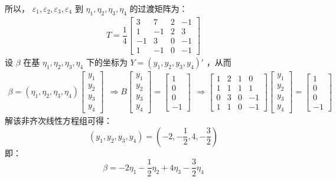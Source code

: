 \documentclass[11pt,a4paper,openany,oneside]{book}
\begin{document}
\begin{enumerate}
所以， $ \varepsilon_1, \varepsilon_2, \varepsilon_3, \varepsilon_4 $ 到 $ \eta_1, \eta_2, \eta_3, \eta_4 $ 的过渡矩阵为：
\begin{gather*}
T =  \dfrac{1}{4}
\begin{bmatrix}
3 & 7 & 2 & -1 \\
1 & -1 & 2 & 3 \\
-1 & 3 & 0 & -1 \\
1 & -1 & 0 & -1
\end{bmatrix}
\end{gather*}
设 $ \beta $ 在基 $ \eta_1, \eta_2, \eta_3, \eta_4 $ 下的坐标为 $ Y=(y_1, y_2, y_3, y_4)' $ ，从而
\begin{gather*}
\beta = (\eta_1, \eta_2, \eta_3, \eta_4)
\begin{bmatrix}
y_1\\ y_2\\ y_3\\ y_4
\end{bmatrix} \ \ \Rightarrow 
B
\begin{bmatrix}
y_1\\ y_2\\ y_3\\ y_4
\end{bmatrix} =
\begin{bmatrix}
1 \\ 0\\ 0\\ -1
\end{bmatrix} \ \ \Rightarrow
\begin{bmatrix}
1  &  2  &  1  &  0  \\
1  &  1  &  1  &  1  \\
0 &  3  &  0  &   -1  \\
1  &  1  &  0  &  -1  
\end{bmatrix}
\begin{bmatrix}
y_1\\ y_2\\ y_3\\ y_4
\end{bmatrix} =
\begin{bmatrix}
1 \\ 0\\ 0\\ -1
\end{bmatrix}
\end{gather*}
解该非齐次线性方程组可得：
 $$  (y_1, y_2, y_3, y_4) = (-2, -\dfrac{1}{2},4, -\dfrac{3}{2} )  $$ 
即：
 $$  \beta = -2\eta_1 -\dfrac{1}{2}\eta_2 + 4\eta_3 - \dfrac{3}{2}\eta_4  $$   \\  \\ 
\end{enumerate}
\end{document}
